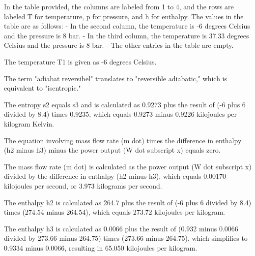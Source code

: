 In the table provided, the columns are labeled from 1 to 4, and the rows are labeled T for temperature, p for pressure, and h for enthalpy. The values in the table are as follows:
- In the second column, the temperature is -6 degrees Celsius and the pressure is 8 bar.
- In the third column, the temperature is 37.33 degrees Celsius and the pressure is 8 bar.
- The other entries in the table are empty.

The temperature T1 is given as -6 degrees Celsius.

The term "adiabat reversibel" translates to "reversible adiabatic," which is equivalent to "isentropic."

The entropy s2 equals s3 and is calculated as 0.9273 plus the result of (-6 plus 6 divided by 8.4) times 0.9235, which equals 0.9273 minus 0.9226 kilojoules per kilogram Kelvin.

The equation involving mass flow rate (m dot) times the difference in enthalpy (h2 minus h3) minus the power output (W dot subscript x) equals zero.

The mass flow rate (m dot) is calculated as the power output (W dot subscript x) divided by the difference in enthalpy (h2 minus h3), which equals 0.00170 kilojoules per second, or 3.973 kilograms per second.

The enthalpy h2 is calculated as 264.7 plus the result of (-6 plus 6 divided by 8.4) times (274.54 minus 264.54), which equals 273.72 kilojoules per kilogram.

The enthalpy h3 is calculated as 0.0066 plus the result of (0.932 minus 0.0066 divided by 273.66 minus 264.75) times (273.66 minus 264.75), which simplifies to 0.9334 minus 0.0066, resulting in 65.050 kilojoules per kilogram.